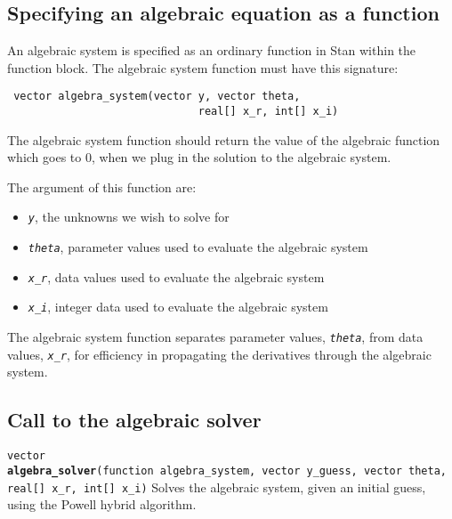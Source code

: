 \documentclass[
  10pt,
]{book}
\begin{document}
\hypertarget{specifying-an-algebraic-equation-as-a-function}{%
\subsection{Specifying an algebraic equation as a function}\label{specifying-an-algebraic-equation-as-a-function}}

An algebraic system is specified as an ordinary function in Stan
within the function block. The algebraic system function must have
this signature:

\begin{verbatim}
 vector algebra_system(vector y, vector theta,
                              real[] x_r, int[] x_i)
\end{verbatim}

The algebraic system function should return the value of the algebraic
function which goes to 0, when we plug in the solution to the
algebraic system.

The argument of this function are:

\begin{itemize}
\item
  \emph{\texttt{y}}, the unknowns we wish to solve for
\item
  \emph{\texttt{theta}}, parameter values used to evaluate the algebraic system
\item
  \emph{\texttt{x\_r}}, data values used to evaluate the algebraic system
\item
  \emph{\texttt{x\_i}}, integer data used to evaluate the algebraic system
\end{itemize}

The algebraic system function separates parameter values, \emph{\texttt{theta}},
from data values, \emph{\texttt{x\_r}}, for efficiency in propagating the derivatives
through the algebraic system.

\hypertarget{call-to-the-algebraic-solver}{%
\subsection{Call to the algebraic solver}\label{call-to-the-algebraic-solver}}


\texttt{vector} \textbf{\texttt{algebra\_solver}}\texttt{(function\ algebra\_system,\ vector\ y\_guess,\ vector\ theta,\ real{[}{]}\ x\_r,\ int{[}{]}\ x\_i)}\newline
Solves the algebraic system, given an initial guess, using the Powell
hybrid algorithm.
\end{document}
